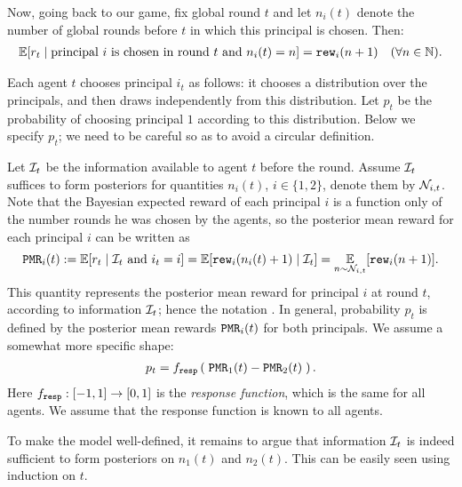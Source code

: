Now, going back to our game, fix global round $t$ and let $n_i(t)$ denote the number of global rounds before $t$ in which this principal is chosen. Then:
\begin{align*}
 \E[r_t \mid \text{principal $i$ is chosen in round $t$ and $n_i(t)=n$} ]
    = \rew_i(n+1) \quad (\forall n\in\N).
\end{align*}

Each agent $t$ chooses principal $i_t$ as follows: it chooses a distribution over the principals, and then draws independently from this distribution. Let $p_t$ be the probability of choosing principal $1$ according to this distribution. Below we specify $p_t$; we need to be careful so as to avoid a circular definition.


Let $\mathcal{I}_t$ be the information available to agent $t$ before the
round. Assume $\mathcal{I}_t$ suffices to form posteriors for quantities
$n_i(t)$, $i\in \{1,2\}$, denote them by $\mathcal{N}_{i,t}$. Note
that the Bayesian expected reward of each principal $i$ is a function
only of the number rounds he was chosen by the agents, so the
posterior mean reward for each principal $i$ can be written as
\begin{align*}
 \PMR_i(t) := \E[r_t \mid \text{$\mI_t$ and $i_t=i$} ]
    = \E[\rew_i(n_i(t)+1) \mid \mI_t]
    = \E_{n\sim \posteriorN{i}{t}}[\rew_i(n+1)].
\end{align*}
This quantity represents the posterior mean reward for principal $i$
at round $t$, according to information $\mathcal{I}_t$; hence the notation \PMR. In general, probability $p_t$ is defined by the
posterior mean rewards $\mathtt{PMR}_i(t)$ for both principals. We assume a
somewhat more specific shape:
\begin{align}
p_t = f_{\mathtt{resp}}\left(\; \mathtt{PMR}_1(t) - \mathtt{PMR}_2(t) \;\right).
\end{align}
Here $f_{\mathtt{resp}}:[-1,1]\to [0,1]$ is the \emph{response function}, which is the same for all agents. We assume that the response function is known to all agents.

To make the model well-defined, it remains to argue that information $\mathcal{I}_t$ is indeed sufficient to form posteriors on $n_1(t)$ and $n_2(t)$. This can be easily seen using induction on $t$.

